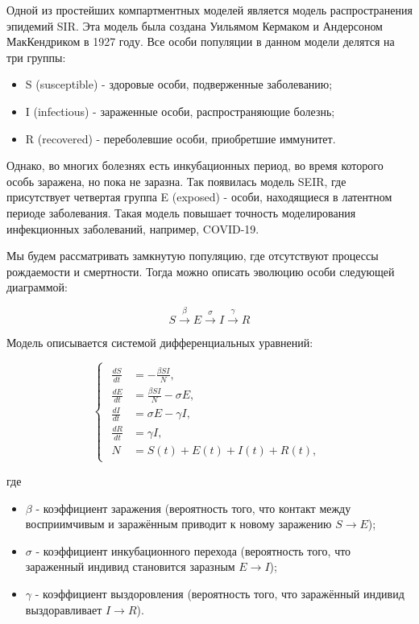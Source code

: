 \documentclass[
  english,
  russian,
  12pt,
  a4paper,
]{phdthesr}
\providecommand{\tightlist}{%
  \setlength{\itemsep}{0pt}\setlength{\parskip}{0pt}}
\begin{document}
Одной из простейших компартментных моделей является модель
распространения эпидемий SIR. Эта модель была создана Уильямом Кермаком
и Андерсоном МакКендриком в 1927 году. Все особи популяции в данном
модели делятся на три группы:

\begin{itemize}
\tightlist
\item
  S (susceptible) - здоровые особи, подверженные заболеванию;
\item
  I (infectious) - зараженные особи, распространяющие болезнь;
\item
  R (recovered) - переболевшие особи, приобретшие иммунитет.
\end{itemize}

Однако, во многих болезнях есть инкубационных период, во время которого
особь заражена, но пока не заразна. Так появилась модель SEIR, где
присутствует четвертая группа E (exposed) - особи, находящиеся в
латентном периоде заболевания. Такая модель повышает точность
моделирования инфекционных заболеваний, например, COVID-19.

Мы будем рассматривать замкнутую популяцию, где отсутствуют процессы
рождаемости и смертности. Тогда можно описать эволюцию особи следующей
диаграммой:

\[
S \xrightarrow{\beta} E \xrightarrow{\sigma} I \xrightarrow{\gamma} R
\]

Модель описывается системой дифференциальных уравнений:

\[
\begin{cases}
\begin{aligned}
\frac{dS}{dt} &= -\frac{\beta SI}{N}, \\
\frac{dE}{dt} &= \frac{\beta SI}{N} - \sigma E, \\
\frac{dI}{dt} &= \sigma E - \gamma I, \\
\frac{dR}{dt} &= \gamma I, \\
N &= S(t) + E(t) + I(t) + R(t),
\end{aligned}
\end{cases}
\]

где

\begin{itemize}
\tightlist
\item
  \(\beta\) - коэффициент заражения (вероятность того, что контакт между
  восприимчивым и заражённым приводит к новому заражению
  \(S \rightarrow E\));
\item
  \(\sigma\) - коэффициент инкубационного перехода (вероятность того,
  что зараженный индивид становится заразным \(E \rightarrow I\));
\item
  \(\gamma\) - коэффициент выздоровления (вероятность того, что
  заражённый индивид выздоравливает \(I \rightarrow R\)).
\end{itemize}
\end{document}
